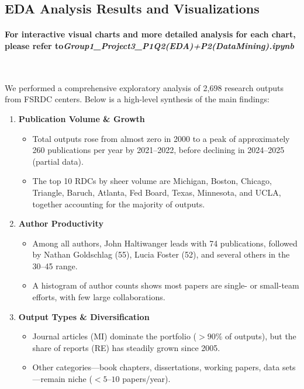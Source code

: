 \documentclass[12pt]{article}
\begin{document}
\subsection{EDA Analysis Results and Visualizations}
\paragraph{\textbf{For interactive visual charts and more detailed analysis for each chart, please refer to\textit{Group1\_Project3\_P1Q2(EDA)+P2(DataMining).ipynb}}}\

We performed a comprehensive exploratory analysis of 2,698 research outputs from FSRDC centers. Below is a high-level synthesis of the main findings:

\begin{enumerate}
  \item \textbf{Publication Volume \& Growth}
    \begin{itemize}
      \item Total outputs rose from almost zero in 2000 to a peak of approximately 260 publications per year by 2021–2022, before declining in 2024–2025 (partial data).
      \item The top 10 RDCs by sheer volume are Michigan, Boston, Chicago, Triangle, Baruch, Atlanta, Fed Board, Texas, Minnesota, and UCLA, together accounting for the majority of outputs.
    \end{itemize}

  \item \textbf{Author Productivity}
    \begin{itemize}
      \item Among all authors, John Haltiwanger leads with 74 publications, followed by Nathan Goldschlag (55), Lucia Foster (52), and several others in the 30–45 range.
      \item A histogram of author counts shows most papers are single- or small-team efforts, with few large collaborations.
    \end{itemize}

  \item \textbf{Output Types \& Diversification}
    \begin{itemize}
      \item Journal articles (MI) dominate the portfolio (\(>90\%\) of outputs), but the share of reports (RE) has steadily grown since 2005.
      \item Other categories—book chapters, dissertations, working papers, data sets—remain niche (\(<5\text{--}10\) papers/year).
    \end{itemize}


\end{enumerate}
\end{document}

